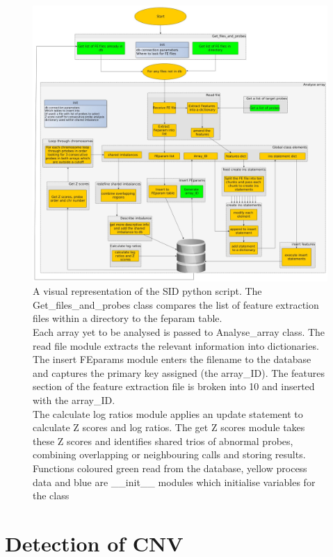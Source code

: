 \begin{figure}
\centering
\includegraphics[width=1.2\linewidth]{./Figures/program_overview_extensive2}
\caption[A visual representation of the SID python script]{A visual representation of the SID python script. The Get\_files\_and\_probes class compares the list of feature extraction files within a directory to the feparam table.\\ Each array yet to be analysed is passed to Analyse\_array class. The read file module extracts the relevant information into dictionaries. The insert FEparams module enters the filename to the database and captures the primary key assigned (the array\_ID). The features section of the feature extraction file is broken into 10 and inserted with the array\_ID.\\ The calculate log ratios module applies an update statement to calculate Z scores and log ratios. The get Z scores module takes these Z scores and identifies shared trios of abnormal probes, combining overlapping or neighbouring calls and storing results. Functions coloured green read from the database, yellow process data and blue are \_\_init\_\_ modules which initialise variables for the class}
\label{fig:program_overview_extensive2}
\end{figure}

\section{Detection of CNV}
